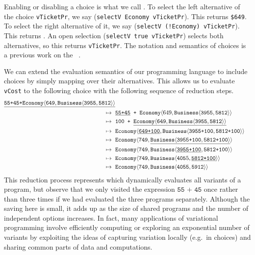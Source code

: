 Enabling or disabling a choice is what we call . To select the left alternative of the choice \texttt{vTicketPr}, we say (\texttt{selectV Economy vTicketPr}). This returns {\texttt{\$649}}. To select the right alternative of it, we say (\texttt{selectV (!Economy) vTicketPr}). 
%
This returns {}. An open selection (\texttt{selectV true vTicketPr}) selects both alternatives, so this returns \texttt{vTicketPr}. The notation and semantics of choices is a previous work on the ~\cite{EW11tosem,Walk13thesis,HW16fosd}.

We can extend the evaluation semantics of our programming language to include choices by simply mapping over their alternatives. This allows us to evaluate \texttt{vCost} to the following choice with the following sequence of reduction steps.
%
\begin{align*}
\underline{\texttt{55+45+\Chc[\texttt{Economy}]{\texttt{649}}{\Chc[\texttt{Business}]{\texttt{3955}}{\texttt{5812}}}}}\\
~\Step~ & \texttt{\underline{55+45} + \Chc[\texttt{Economy}]{649}{\Chc[\texttt{Business}]{\texttt{3955}}{\texttt{5812}}}} \\
~\Step~ & \texttt{100 + \underline{\Chc[\texttt{Economy}]{\texttt{649}}{\Chc[\texttt{Business}]{\texttt{3955}}{\texttt{5812}}}}} \\
~\Step~ & \texttt{\Chc[\texttt{Economy}]{\underline{\texttt{649+100}}}{\Chc[\texttt{Business}]{\texttt{3955+100}}{\texttt{5812+100}}}} \\
~\Step~ & \texttt{\Chc[\texttt{Economy}]{\texttt{749}}{\underline{\Chc[\texttt{Business}]{\texttt{3955+100}}{\texttt{5812+100}}}}} \\
~\Step~ & \texttt{\Chc[\texttt{Economy}]{\texttt{749}}{\Chc[\texttt{Business}]{\underline{\texttt{3955+100}}}{\texttt{5812+100}}}}  \\
~\Step~ & \texttt{\Chc[\texttt{Economy}]{\texttt{749}}{\Chc[\texttt{Business}]{\texttt{405}5}{\underline{\texttt{5812+100}}}}}  \\
~\Step~ & \texttt{\Chc[\texttt{Economy}]{\texttt{749}}{\Chc[\texttt{Business}]{\texttt{4055}}{\texttt{5912}}}}
\end{align*}
%
This reduction process represents  which dynamically evaluates all variants of a program, but observe that we only visited the expression $\texttt{55 + 45}$ once rather than three times if we had evaluated the three programs separately.
%
Although the saving here is small, it adds up as the size of shared programs and the number of independent options increases.
%
In fact, many applications of variational programming involve efficiently computing or exploring an exponential number of variants by exploiting the ideas of capturing variation locally (e.g.\ in choices) and sharing common parts of data and computations. 

